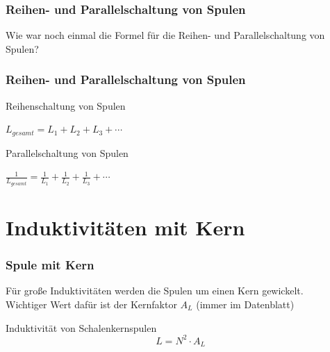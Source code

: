 \begin{frame}
  \frametitle{Reihen- und Parallelschaltung von Spulen}
  \begin{center}
    \huge Wie war noch einmal die Formel für die Reihen- und Parallelschaltung von Spulen?
  \end{center}
\end{frame}

\begin{frame}
  \frametitle{Reihen- und Parallelschaltung von Spulen}
  \begin{block}{Reihenschaltung von Spulen}
    \begin{center}
      \huge{$L_{gesamt} = L_1 + L_2 + L_3 + \cdots$}
    \end{center}
  \end{block}
  \pause
  \begin{block}{Parallelschaltung von Spulen}
    \begin{center}
      \huge{$\frac{1}{L_{gesamt}} = \frac{1}{L_1} + \frac{1}{L_2} + \frac{1}{L_3} + \cdots$}
    \end{center}
  \end{block}
\end{frame}

\section*{Induktivitäten mit Kern}

\begin{frame}
  \frametitle{Spule mit Kern}
  \begin{center}
    Für große Induktivitäten werden die Spulen um einen Kern gewickelt.\\
    Wichtiger Wert dafür ist der Kernfaktor $A_{L}$ (immer im Datenblatt)
    \begin{block}{Induktivität von Schalenkernspulen}
      \huge	$$L = N^2 \cdot A_{L}$$
    \end{block}
  \end{center}
\end{frame}

